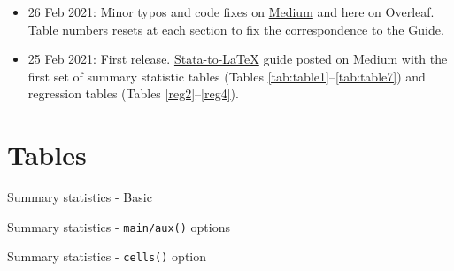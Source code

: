 \documentclass[11pt]{article}
\numberwithin{table}{section}   %
\begin{document}
\begin{itemize}
    \item 26 Feb 2021: Minor typos and code fixes on \href{https://medium.com/the-stata-guide/the-stata-to-latex-guide-6e7ed5622856}{Medium} and here on Overleaf. Table numbers resets at each section to fix the correspondence to the Guide.
    \item 25 Feb 2021: First release. \href{https://medium.com/the-stata-guide/the-stata-to-latex-guide-6e7ed5622856}{Stata-to-\LaTeX} guide posted on Medium with the first set of summary statistic tables (Tables \ref{tab:table1}--\ref{tab:table7}) and regression tables (Tables \ref{reg2}--\ref{reg4}). 
\end{itemize}

\clearpage




\section{Tables} \label{sec:summstat}




\begin{table}[!htbp]
\caption{Summary statistics - Basic} \label{tab:table1}
\centering

\end{table}

\vfill

%




\begin{table}[!htbp]
\caption{Summary statistics - \texttt{main/aux()} options} \label{tab:table2}
    \begin{center}
        
    \end{center}
\end{table}

\vfill

\begin{table}[!htbp]
\caption{Summary statistics - \texttt{cells()} option} \label{tab:table3}
    \begin{center}
        
    \end{center}
\end{table}


\clearpage
\end{document}

